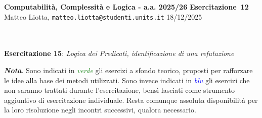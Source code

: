 \documentclass[a4paper,10pt]{article}
\makeatletter
\newcommand{\EsercitazioneNum}{12}
\newcommand{\Data}{18/12/2025}
\newcommand{\DocType}{Esercitazione} %
\newcommand{\FullTitle}{\DocType\ \EsercitazioneNum}
\newcommand{\Header}{
\noindent
  \small \textbf{Computabilità, Complessità e Logica - a.a. 2025/26} \hfill \textbf{\FullTitle} \\[0.2cm]
  \scriptsize Matteo Liotta, \texttt{matteo.liotta@studenti.units.it} \hfill \Data \\[0.2cm]
  \noindent\makebox[\linewidth]{\rule{\linewidth}{0.4pt}} \\[0.3cm]}
\makeatother
\begin{document}
\footnotesize  %
\Header\\[0.7cm]



    
    
    \noindent\Large \textbf{Esercitazione 15}: \textit{Logica dei Predicati, identificazione di una refutazione} 
    \begin{osservazioni}
        \textbf{\textit{Nota}}. Sono indicati in \textcolor{ForestGreen}{\textit{verde}} gli esercizi a sfondo teorico, proposti per rafforzare le idee alla base dei metodi utilizzati. Sono invece indicati in \textcolor{blue}{\textit{blu}} gli esercizi che non saranno trattati durante l'esercitazione, bensì lasciati come strumento aggiuntivo di esercitazione individuale. Resta comunque assoluta disponibilità per la loro risoluzione negli incontri successivi, qualora necessario. 
    \end{osservazioni}
    
\end{document}

